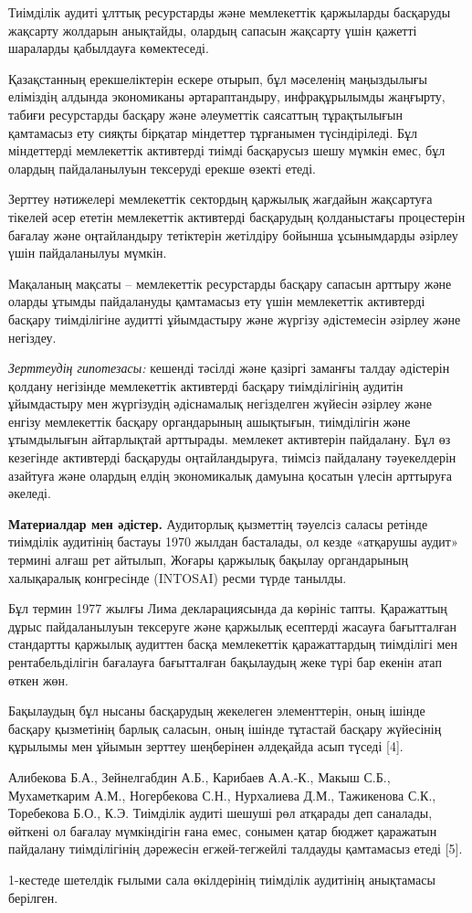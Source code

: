 \begin{multicols}{2}
Тиімділік аудиті ұлттық ресурстарды және мемлекеттік қаржыларды
басқаруды жақсарту жолдарын анықтайды, олардың сапасын жақсарту үшін
қажетті шараларды қабылдауға көмектеседі.

Қазақстанның ерекшеліктерін ескере отырып, бұл мәселенің маңыздылығы
еліміздің алдында экономиканы әртараптандыру, инфрақұрылымды жаңғырту,
табиғи ресурстарды басқару және әлеуметтік саясаттың тұрақтылығын
қамтамасыз ету сияқты бірқатар міндеттер тұрғанымен түсіндіріледі. Бұл
міндеттерді мемлекеттік активтерді тиімді басқарусыз шешу мүмкін емес,
бұл олардың пайдаланылуын тексеруді ерекше өзекті етеді.

Зерттеу нәтижелері мемлекеттік сектордың қаржылық жағдайын жақсартуға
тікелей әсер ететін мемлекеттік активтерді басқарудың қолданыстағы
процестерін бағалау және оңтайландыру тетіктерін жетілдіру бойынша
ұсынымдарды әзірлеу үшін пайдаланылуы мүмкін.

Мақаланың мақсаты -- мемлекеттік ресурстарды басқару сапасын арттыру
және оларды ұтымды пайдалануды қамтамасыз ету үшін мемлекеттік
активтерді басқару тиімділігіне аудитті ұйымдастыру және жүргізу
әдістемесін әзірлеу және негіздеу.

\emph{Зерттеудің гипотезасы:} кешенді тәсілді және қазіргі заманғы
талдау әдістерін қолдану негізінде мемлекеттік активтерді басқару
тиімділігінің аудитін ұйымдастыру мен жүргізудің әдіснамалық негізделген
жүйесін әзірлеу және енгізу мемлекеттік басқару органдарының ашықтығын,
тиімділігін және ұтымдылығын айтарлықтай арттырады. мемлекет активтерін
пайдалану. Бұл өз кезегінде активтерді басқаруды оңтайландыруға, тиімсіз
пайдалану тәуекелдерін азайтуға және олардың елдің экономикалық дамуына
қосатын үлесін арттыруға әкеледі.

{\bfseries Материалдар мен әдістер.} Аудиторлық қызметтің тәуелсіз саласы
ретінде тиімділік аудитінің бастауы 1970 жылдан басталады, ол кезде
«атқарушы аудит» термині алғаш рет айтылып, Жоғары қаржылық бақылау
органдарының халықаралық конгресінде (INTOSAI) ресми түрде танылды.

Бұл термин 1977 жылғы Лима декларациясында да көрініс тапты. Қаражаттың
дұрыс пайдаланылуын тексеруге және қаржылық есептерді жасауға
бағытталған стандартты қаржылық аудиттен басқа мемлекеттік қаражаттардың
тиімділігі мен рентабельділігін бағалауға бағытталған бақылаудың жеке
түрі бар екенін атап өткен жөн.

Бақылаудың бұл нысаны басқарудың жекелеген элементтерін, оның ішінде
басқару қызметінің барлық саласын, оның ішінде тұтастай басқару
жүйесінің құрылымы мен ұйымын зерттеу шеңберінен әлдеқайда асып түседі
{[}4{]}.

Алибекова Б.А., Зейнелгабдин А.Б., Карибаев А.А.-К., Макыш С.Б.,
Мухаметкарим А.М., Ногербекова С.Н., Нурхалиева Д.М., Тажикенова С.К.,
Торебекова Б.О., К.Э. Тиімділік аудиті шешуші рөл атқарады деп саналады,
өйткені ол бағалау мүмкіндігін ғана емес, сонымен қатар бюджет қаражатын
пайдалану тиімділігінің дәрежесін егжей-тегжейлі талдауды қамтамасыз
етеді {[}5{]}.

1-кестеде шетелдік ғылыми сала өкілдерінің тиімділік аудитінің
анықтамасы берілген.
\end{multicols}


